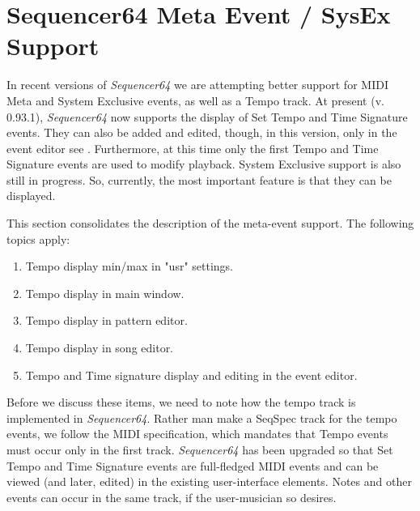 %
%
%

\section{Sequencer64 Meta Event / SysEx Support}
\label{sec:meta_events}

   In recent versions of \textsl{Sequencer64} we are attempting better support
   for MIDI Meta and System Exclusive events, as well as a Tempo track.
   At present (v. 0.93.1), \textsl{Sequencer64} now supports the display of Set
   Tempo and Time Signature events.  They can also be added and edited, though,
   in this version, only in the event editor
   see .
   Furthermore, at this time only the first Tempo and Time Signature events are
   used to modify playback.
   System Exclusive support is also still in progress.
   So, currently, the most important feature is that they can be displayed.

   This section consolidates the description of the meta-event support.
   The following topics apply:

   \begin{enumerate}
      \item Tempo display min/max in "usr" settings.
      \item Tempo display in main window.
      \item Tempo display in pattern editor.
      \item Tempo display in song editor.
      \item Tempo and Time signature display and editing in the event editor.
   \end{enumerate}

   Before we discuss these items, we need to note how the tempo track is
   implemented in \textsl{Sequencer64}.  Rather man make a SeqSpec track for
   the tempo events, we follow the MIDI specification, which mandates that
   Tempo events must occur only in the first track.  \textsl{Sequencer64} has
   been upgraded so that Set Tempo and Time Signature events are full-fledged
   MIDI events and can be viewed (and later, edited) in the existing
   user-interface elements.  Notes and other events can occur in the same
   track, if the user-musician so desires.

